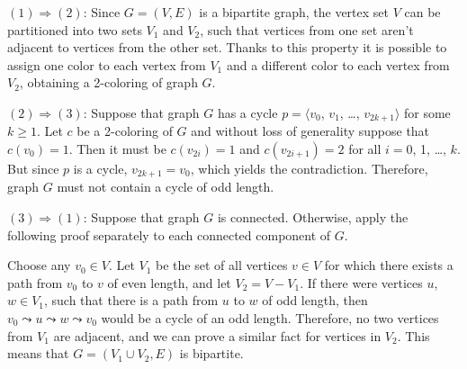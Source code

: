 \subproblem
$(1)\Rightarrow(2)$: Since $G=(V,E)$ is a bipartite graph, the vertex set $V$ can be partitioned into two sets $V_1$ and $V_2$, such that vertices from one set aren't adjacent to vertices from the other set.
Thanks to this property it is possible to assign one color to each vertex from $V_1$ and a different color to each vertex from $V_2$, obtaining a 2-coloring of graph $G$.

$(2)\Rightarrow(3)$: Suppose that graph $G$ has a cycle $p=\langle v_0$, $v_1$, \dots, $v_{2k+1}\rangle$ for some $k\ge1$.
Let $c$ be a 2-coloring of $G$ and without loss of generality suppose that $c(v_0)=1$.
Then it must be $c(v_{2i})=1$ and $c(v_{2i+1})=2$ for all $i=0$, 1, \dots, $k$.
But since $p$ is a cycle, $v_{2k+1}=v_0$, which yields the contradiction.
Therefore, graph $G$ must not contain a cycle of odd length.

$(3)\Rightarrow(1)$: Suppose that graph $G$ is connected.
Otherwise, apply the following proof separately to each connected component of $G$.

Choose any $v_0\in V$.
Let $V_1$ be the set of all vertices $v\in V$ for which there exists a path from $v_0$ to $v$ of even length, and let $V_2=V-V_1$.
If there were vertices $u$, $w\in V_1$, such that there is a path from $u$ to $w$ of odd length, then $v_0\leadsto u\leadsto w\leadsto v_0$ would be a cycle of an odd length.
Therefore, no two vertices from $V_1$ are adjacent, and we can prove a similar fact for vertices in $V_2$.
This means that $G=(V_1\cup V_2,E)$ is bipartite.
